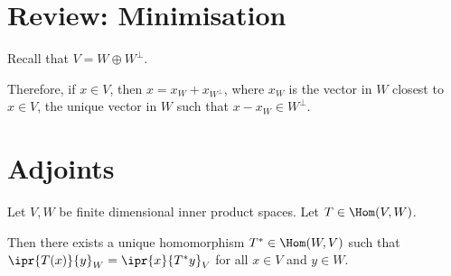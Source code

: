 \documentclass[11pt]{scrartcl}
\begin{document}
\section{Review: Minimisation}
Recall that $V = W \oplus W^{\bot}$.

Therefore, if $x\in V$, then $x=x_W+x_{W^{\bot}}$, where $x_W$ is the
vector in $W$ closest to $x\in V$, the unique vector in $W$ such that
$x-x_W\in W^{\bot}$.

\section{Adjoints}
\begin{theorem}
      \label{6-9}
Let $V, W$ be finite dimensional inner product spaces. Let
$T \in \Hom(V,W)$.

Then there exists a unique homomorphism $T^{*}\in \Hom(W,V)$ such that
$\ipr{T(x)}{y}_W=\ipr{x}{T^{*}y}_{V}$ for all $x\in V$ and $y\in W$.
\end{theorem}
\end{document}
